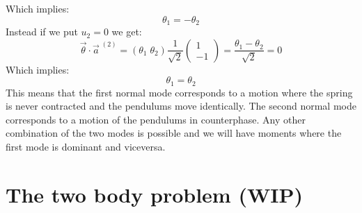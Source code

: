 Which implies:
\begin{equation}
    \theta_1 = -\theta_2
\end{equation}
Instead if we put $u_2=0$ we get:
\begin{equation}
    \vec{\theta} \cdot \vec{a}^{\;(2)} = (\theta_1\;\theta_2)\dfrac{1}{\sqrt{2}}\begin{pmatrix}
        1\\
        -1
    \end{pmatrix} = \dfrac{\theta_1 - \theta_2}{\sqrt{2}} = 0
\end{equation}
Which implies:
\begin{equation}
    \theta_1 = \theta_2
\end{equation}
This means that the first normal mode corresponds to a motion where the spring is never contracted and the pendulums move identically. The second normal mode corresponds to a motion of the pendulums in counterphase. Any other combination of the two modes is possible and we will have moments where the first mode is dominant and viceversa.
\section{The two body problem (WIP)}
